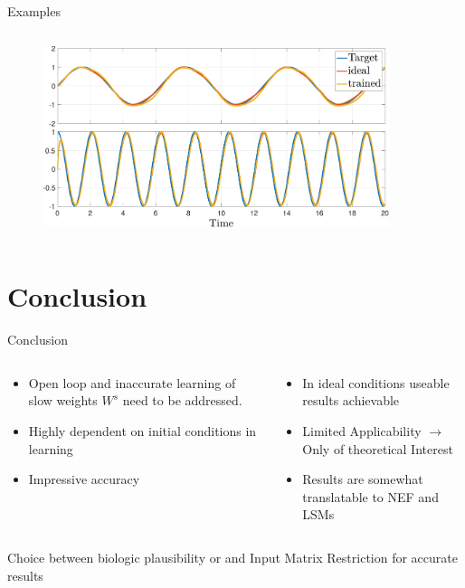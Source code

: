 \documentclass[17pt, t, lualatex]{beamer}
\begin{document}
\begin{frame}{Examples}
\begin{columns}
\begin{column}{0.45\textwidth}
\begin{figure}
				\includegraphics[width = 0.9\textwidth]{figures/plots/everything/all_closed_sine_base.pdf}
			\end{figure}
		\end{column}
	\end{columns}
\end{frame}



\section{Conclusion}\insertsectionpage
\begin{frame}{Conclusion}
	\vspace{-1cm}
	\begin{columns}
		\begin{column}{0.45\textwidth}
			\begin{itemize}
				\setlength\itemsep{0.7em}
				\item Open loop and inaccurate learning of slow weights $W^s$ need to be addressed.
				\item Highly dependent on initial conditions in learning
				\item Impressive accuracy
			\end{itemize}
		\end{column}
		\vrule
		\begin{column}{0.45\textwidth}
			\begin{itemize}
				\setlength\itemsep{0.7em}
				\item In ideal conditions useable results achievable
				\item Limited Applicability $\rightarrow$ Only of theoretical Interest
				\item Results are somewhat translatable to NEF and LSMs
			\end{itemize}
		\end{column}
	\end{columns}
	\vspace{0.5cm}
	Choice between biologic plausibility or and Input Matrix Restriction for accurate results
\end{frame}
\end{document}

